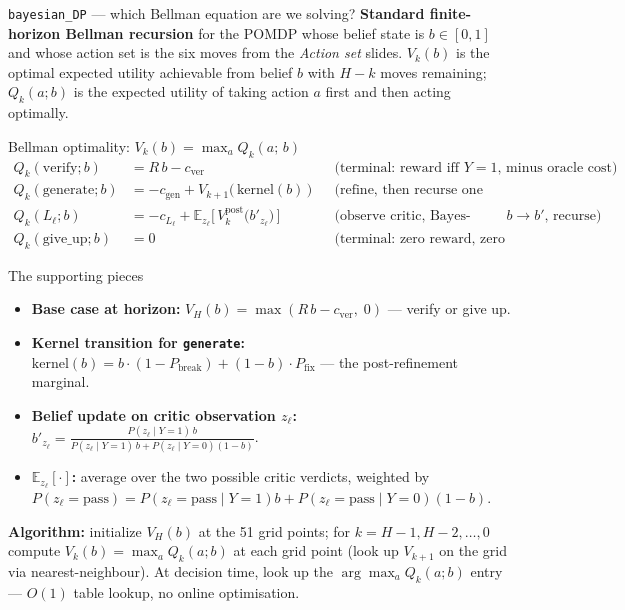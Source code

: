 \documentclass[10pt]{beamer}
\newcommand{\info}[1]{\textcolor{primaryBlue}{\textbf{#1}}}
\begin{document}
\begin{frame}{\texttt{bayesian\_DP} --- which Bellman equation are we solving?}
\info{Standard finite-horizon Bellman recursion} for the POMDP whose belief
state is $b \in [0,1]$ and whose action set is the six moves from the
\emph{Action set} slides. $V_k(b)$ is the optimal expected utility achievable
from belief $b$ with $H{-}k$ moves remaining; $Q_k(a; b)$ is the expected
utility of taking action $a$ first and then acting optimally.

\begin{block}{Bellman optimality: $V_k(b) = \max_a Q_k(a;\, b)$}
\vspace{-0.15cm}
{\footnotesize
\begin{align*}
Q_k(\text{verify}; b)    &= R\, b - c_\text{ver}
   && \text{(terminal: reward iff $Y{=}1$, minus oracle cost)}\\
Q_k(\text{generate}; b)  &= -c_\text{gen} + V_{k{+}1}\bigl(\,\text{kernel}(b)\,\bigr)
   && \text{(refine, then recurse one step later)}\\
Q_k(L_\ell; b)           &= -c_{L_\ell} + \mathbb{E}_{z_\ell}\bigl[\,V_k^{\text{post}}\!\bigl(b'_{z_\ell}\bigr)\,\bigr]
   && \text{(observe critic, Bayes-update $b \!\to\! b'$, recurse)}\\
Q_k(\text{give\_up}; b)  &= 0
   && \text{(terminal: zero reward, zero cost)}
\end{align*}}
\vspace{-0.35cm}
\end{block}

\begin{block}{The supporting pieces}
\footnotesize
\begin{itemize}\setlength\itemsep{1pt}
\item \textbf{Base case at horizon:} $V_H(b) = \max(R\,b - c_\text{ver},\; 0)$ --- verify or give up.
\item \textbf{Kernel transition for \texttt{generate}:}
$\text{kernel}(b) = b\cdot(1{-}P_{\text{break}}) + (1{-}b)\cdot P_{\text{fix}}$ --- the post-refinement marginal.
\item \textbf{Belief update on critic observation $z_\ell$:}
$b'_{z_\ell} = \frac{P(z_\ell\mid Y{=}1)\,b}{P(z_\ell\mid Y{=}1)\,b + P(z_\ell\mid Y{=}0)(1{-}b)}$.
\item \textbf{$\mathbb{E}_{z_\ell}[\cdot]$:} average over the two possible
critic verdicts, weighted by $P(z_\ell{=}\text{pass}) = P(z_\ell{=}\text{pass}\mid Y{=}1)b + P(z_\ell{=}\text{pass}\mid Y{=}0)(1{-}b)$.
\end{itemize}
\end{block}

\textcolor{softGrey}{\scriptsize \textbf{Algorithm:} initialize $V_H(b)$ at
the 51 grid points; for $k = H{-}1, H{-}2, \dots, 0$ compute $V_k(b) =
\max_a Q_k(a;b)$ at each grid point (look up $V_{k+1}$ on the grid via
nearest-neighbour). At decision time, look up the $\arg\max_a Q_k(a;b)$
entry --- $O(1)$ table lookup, no online optimisation.}
\end{frame}
\end{document}
